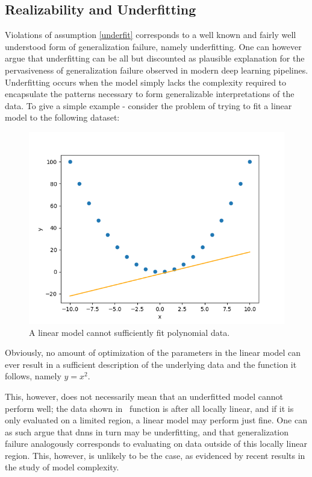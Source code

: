 	\subsection{Realizability and Underfitting}
		Violations of assumption \ref{underfit} corresponds to a well known and fairly well understood form of generalization failure, namely underfitting. One can however argue that underfitting can be all but discounted as plausible explanation for the pervasiveness of generalization failure observed in modern deep learning pipelines. Underfitting occurs when the model simply lacks the complexity required to encapsulate the patterns necessary to form generalizable interpretations of the data. To give a simple example - consider the problem of trying to fit a linear model to the following dataset: 
		\begin{figure}[htb]
			\includegraphics[width=\linewidth]{illustrations/regression_example.png}
			\caption[Underfitting]{A linear model cannot sufficiently fit polynomial data.}
			\label{underfit_example}
		\end{figure}
		Obviously, no amount of optimization of the parameters in the linear model can ever result in a sufficient description of the underlying data and the function it follows, namely \(y=x^2\). 
		
		This, however, does not necessarily mean that an underfitted model cannot perform well; the data shown in~ function is after all locally linear, and if it is only evaluated on a limited region, a linear model may perform just fine. One can as such argue that \glspl{dnn} in turn may be underfitting, and that generalization failure analogously corresponds to evaluating on data outside of this locally linear region. This, however, is unlikely to be the case, as evidenced by recent results in the study of model complexity.
		
